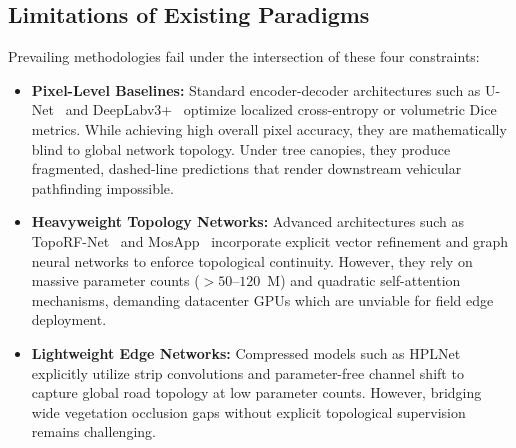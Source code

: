 \documentclass[conference]{IEEEtran}
\begin{document}
\subsection{Limitations of Existing Paradigms}
Prevailing methodologies fail under the intersection of these four constraints:
\begin{itemize}
    \item \textbf{Pixel-Level Baselines:} Standard encoder-decoder architectures such as U-Net~\cite{ronneberger2015unet} and DeepLabv3+~\cite{chen2017deeplab} optimize localized cross-entropy or volumetric Dice metrics. While achieving high overall pixel accuracy, they are mathematically blind to global network topology. Under tree canopies, they produce fragmented, dashed-line predictions that render downstream vehicular pathfinding impossible.
    \item \textbf{Heavyweight Topology Networks:} Advanced architectures such as TopoRF-Net~\cite{toporf2025} and MosApp~\cite{mosapp2024} incorporate explicit vector refinement and graph neural networks to enforce topological continuity. However, they rely on massive parameter counts ($>50\text{--}120$~M) and quadratic self-attention mechanisms, demanding datacenter GPUs which are unviable for field edge deployment.
    \item \textbf{Lightweight Edge Networks:} Compressed models such as HPLNet~\cite{hplnet2025} explicitly utilize strip convolutions and parameter-free channel shift to capture global road topology at low parameter counts. However, bridging wide vegetation occlusion gaps without explicit topological supervision remains challenging.
\end{itemize}
\end{document}
